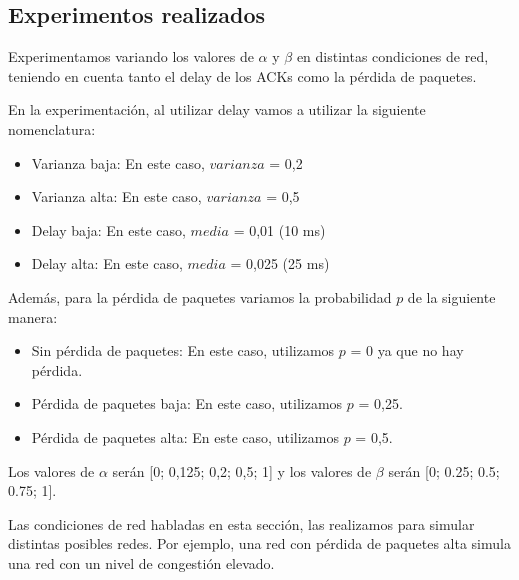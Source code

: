\subsection{Experimentos realizados}
Experimentamos variando los valores de $\alpha$ y $\beta$ en distintas condiciones de red, teniendo en cuenta tanto el delay de los ACKs como la pérdida de paquetes.

En la experimentación, al utilizar delay vamos a utilizar la siguiente nomenclatura:
\begin{itemize}
 \item Varianza baja: En este caso, $varianza$ = 0,2
 \item Varianza alta: En este caso, $varianza$ = 0,5
 \item Delay baja: En este caso, $media$ = 0,01 (10 ms)
 \item Delay alta: En este caso, $media$ = 0,025 (25 ms)
\end{itemize}
 
Además, para la pérdida de paquetes variamos la probabilidad $p$ de la siguiente manera:
\begin{itemize}
 \item Sin pérdida de paquetes: En este caso, utilizamos $p$ = 0 ya que no hay pérdida. 
 \item Pérdida de paquetes baja: En este caso, utilizamos $p$ = 0,25.
 \item Pérdida de paquetes alta: En este caso, utilizamos $p$ = 0,5.
\end{itemize}

Los valores de $\alpha$ serán [0; 0,125; 0,2; 0,5; 1] y los valores de $\beta$ serán [0; 0.25; 0.5; 0.75; 1].

Las condiciones de red habladas en esta sección, las realizamos para simular distintas posibles redes. Por ejemplo, una red con pérdida de paquetes alta simula una red con un nivel de congestión elevado.